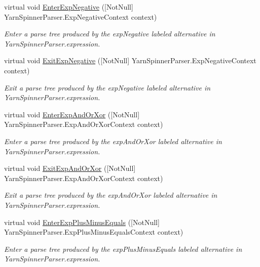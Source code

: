 \begin{DoxyCompactItemize}
virtual void \hyperlink{a00190_a85e82341fb00749dcc443062ce7e6cd4}{Enter\-Exp\-Negative} (\mbox{[}Not\-Null\mbox{]} Yarn\-Spinner\-Parser.\-Exp\-Negative\-Context context)
\begin{DoxyCompactList}\small\item\em Enter a parse tree produced by the {\ttfamily exp\-Negative} labeled alternative in Yarn\-Spinner\-Parser.\-expression. \end{DoxyCompactList}\item 
virtual void \hyperlink{a00190_accebff941879b7b98517ee172bc88c51}{Exit\-Exp\-Negative} (\mbox{[}Not\-Null\mbox{]} Yarn\-Spinner\-Parser.\-Exp\-Negative\-Context context)
\begin{DoxyCompactList}\small\item\em Exit a parse tree produced by the {\ttfamily exp\-Negative} labeled alternative in Yarn\-Spinner\-Parser.\-expression. \end{DoxyCompactList}\item 
virtual void \hyperlink{a00190_abe7e39550dec3976ad45afbd5a00984a}{Enter\-Exp\-And\-Or\-Xor} (\mbox{[}Not\-Null\mbox{]} Yarn\-Spinner\-Parser.\-Exp\-And\-Or\-Xor\-Context context)
\begin{DoxyCompactList}\small\item\em Enter a parse tree produced by the {\ttfamily exp\-And\-Or\-Xor} labeled alternative in Yarn\-Spinner\-Parser.\-expression. \end{DoxyCompactList}\item 
virtual void \hyperlink{a00190_a126a1a450281df186411ba708a4f8edb}{Exit\-Exp\-And\-Or\-Xor} (\mbox{[}Not\-Null\mbox{]} Yarn\-Spinner\-Parser.\-Exp\-And\-Or\-Xor\-Context context)
\begin{DoxyCompactList}\small\item\em Exit a parse tree produced by the {\ttfamily exp\-And\-Or\-Xor} labeled alternative in Yarn\-Spinner\-Parser.\-expression. \end{DoxyCompactList}\item 
virtual void \hyperlink{a00190_a905bac017e14a6d3aeea293831e3387d}{Enter\-Exp\-Plus\-Minus\-Equals} (\mbox{[}Not\-Null\mbox{]} Yarn\-Spinner\-Parser.\-Exp\-Plus\-Minus\-Equals\-Context context)
\begin{DoxyCompactList}\small\item\em Enter a parse tree produced by the {\ttfamily exp\-Plus\-Minus\-Equals} labeled alternative in Yarn\-Spinner\-Parser.\-expression. \end{DoxyCompactList}\item 

\end{DoxyCompactItemize}
